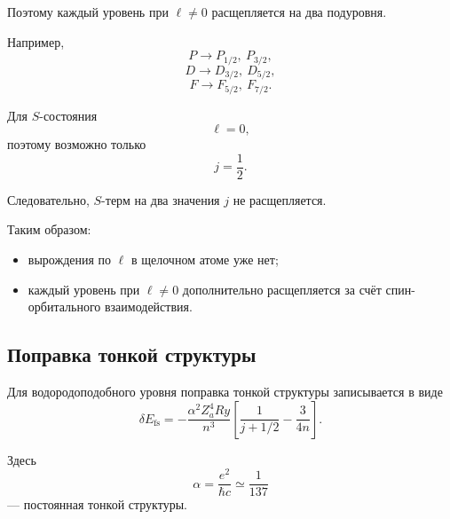 \documentclass[../final.tex]{subfiles}
\begin{document}
Поэтому каждый уровень при \(\ell\neq0\) расщепляется на два подуровня.

Например,
\begin{equation*}
    P
    \longrightarrow
    P_{1/2},
    \ P_{3/2},
\end{equation*}
\begin{equation*}
    D
    \longrightarrow
    D_{3/2},
    \ D_{5/2},
\end{equation*}
\begin{equation*}
    F
    \longrightarrow
    F_{5/2},
    \ F_{7/2}.
\end{equation*}

Для \(S\)-состояния
\begin{equation*}
    \ell=0,
\end{equation*}
поэтому возможно только
\begin{equation*}
    \boxed{
        j=\frac12
    }.
\end{equation*}

Следовательно, \(S\)-терм на два значения \(j\) не расщепляется.

Таким образом:

\begin{itemize}
    \item вырождения по \(\ell\) в щелочном атоме уже нет;
    \item каждый уровень при \(\ell\neq0\) дополнительно расщепляется
    за счёт спин-орбитального взаимодействия.
\end{itemize}

%
%

\subsection{Поправка тонкой структуры}

Для водородоподобного уровня поправка тонкой структуры записывается
в виде
\begin{equation*}
    \boxed{
        \delta E_{\mathrm{fs}}
        =
        -\frac{\alpha^2Z_a^4Ry}{n^3}
        \left[
            \frac{1}{j+1/2}
            -
            \frac{3}{4n}
        \right]
    }.
\end{equation*}

Здесь
\begin{equation*}
    \alpha
    =
    \frac{e^2}{\hbar c}
    \simeq
    \frac{1}{137}
\end{equation*}
--- постоянная тонкой структуры.
\end{document}
